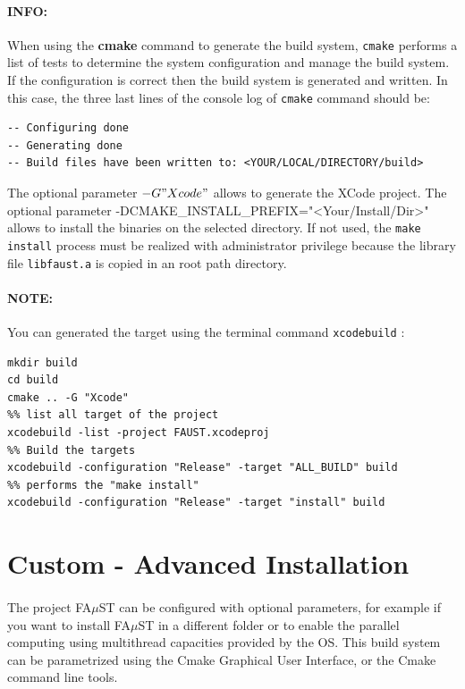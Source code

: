 \paragraph{INFO:}When using the \textbf{cmake} command to generate the build system, \texttt{cmake} performs a list of tests to determine the system configuration and manage the build system. If the configuration is correct then the build system is generated and written. In this case, the three last lines of the console log of \texttt{cmake} command should be:
\begin{lstlisting}
-- Configuring done 
-- Generating done 
-- Build files have been written to: <YOUR/LOCAL/DIRECTORY/build>
\end{lstlisting}
The optional parameter \texttt{$-G "Xcode"$} allows to generate the XCode project. The optional parameter -DCMAKE\_INSTALL\_PREFIX="<Your/Install/Dir>" allows to install the binaries on the selected directory. If not used, the \texttt{make install} process must be realized with administrator privilege because the library file \texttt{libfaust.a} is copied in an root path directory. 


\paragraph{NOTE:}You can generated the target using the terminal command \texttt{xcodebuild} :
\begin{lstlisting}
mkdir build
cd build
cmake .. -G "Xcode"
%% list all target of the project
xcodebuild -list -project FAUST.xcodeproj 
%% Build the targets
xcodebuild -configuration "Release" -target "ALL_BUILD" build 
%% performs the "make install"
xcodebuild -configuration "Release" -target "install" build 
\end{lstlisting}




\section{Custom - Advanced Installation}\label{sec:UnixCustomInstall}

\paragraph{}The project FA$\mu$ST can be configured with optional parameters, for example if you want to install FA$\mu$ST in a different folder or to enable the parallel computing using multithread capacities provided by the OS. This build system can be parametrized using the Cmake Graphical User Interface, or the Cmake command line tools. 

